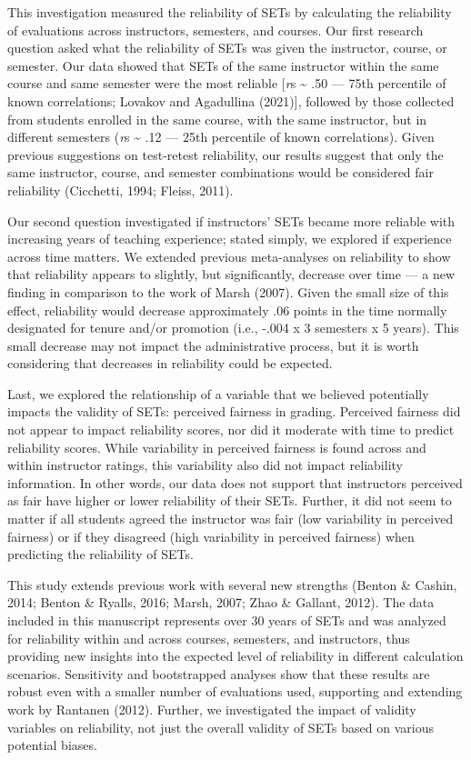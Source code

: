 \documentclass[
  man]{apa7}
\begin{document}
This investigation measured the reliability of SETs by calculating the reliability of evaluations across instructors, semesters, and courses. Our first research question asked what the reliability of SETs was given the instructor, course, or semester. Our data showed that SETs of the same instructor within the same course and same semester were the most reliable {[}\emph{r}s \textasciitilde{} .50 --- 75th percentile of known correlations; Lovakov and Agadullina (2021){]}, followed by those collected from students enrolled in the same course, with the same instructor, but in different semesters (\emph{r}s \textasciitilde{} .12 --- 25th percentile of known correlations). Given previous suggestions on test-retest reliability, our results suggest that only the same instructor, course, and semester combinations would be considered fair reliability (Cicchetti, 1994; Fleiss, 2011).

Our second question investigated if instructors' SETs
became more reliable with increasing years of teaching experience;
stated simply, we explored if experience across time matters. We
extended previous meta-analyses on reliability to show that reliability
appears to slightly, but significantly, decrease over time --- a new
finding in comparison to the work of Marsh (2007). Given the small size of
this effect, reliability would decrease approximately .06 points in the
time normally designated for tenure and/or promotion (i.e., -.004 x 3
semesters x 5 years). This small decrease may not impact the
administrative process, but it is worth considering that decreases in
reliability could be expected.

Last, we explored the relationship of a variable that we believed
potentially impacts the validity of SETs: perceived fairness in grading.
Perceived fairness did not appear to impact reliability scores, nor did
it moderate with time to predict reliability scores. While variability
in perceived fairness is found across and within instructor ratings,
this variability also did not impact reliability information. In other
words, our data does not support that instructors perceived as fair have
higher or lower reliability of their SETs. Further, it did not seem to
matter if all students agreed the instructor was fair (low variability
in perceived fairness) or if they disagreed (high variability in
perceived fairness) when predicting the reliability of SETs.

This study extends previous work with several new strengths (Benton \& Cashin, 2014; Benton \& Ryalls, 2016; Marsh, 2007; Zhao \& Gallant, 2012). The data included in this
manuscript represents over 30 years of SETs and was analyzed for
reliability within and across courses, semesters, and instructors, thus providing new insights into the expected level of reliability in
different calculation scenarios. Sensitivity and bootstrapped analyses
show that these results are robust even with a smaller number of
evaluations used, supporting and extending work by Rantanen (2012).
Further, we investigated the impact of validity variables on
reliability, not just the overall validity of SETs based on various
potential biases.
\end{document}
